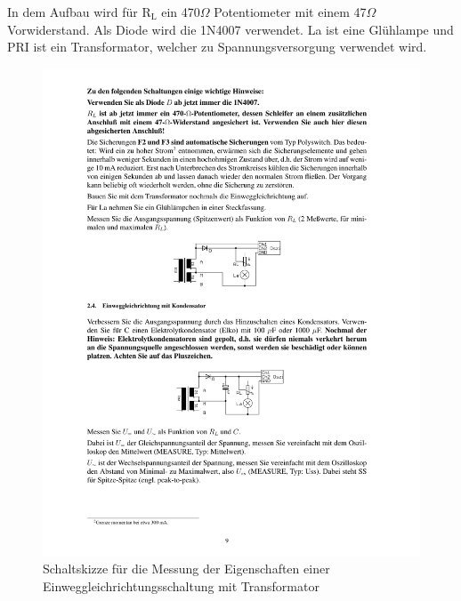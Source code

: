 \documentclass[12pt,a4paper]{article}
\begin{document}
In dem Aufbau wird für R$_\text{L}$ ein 470$\Omega$ Potentiometer mit einem 47$\Omega$ Vorwiderstand. Als Diode wird die 1N4007 verwendet. La ist eine Glühlampe und PRI ist ein Transformator, welcher zu Spannungsversorgung verwendet wird.

\begin{figure}[H] 
  \centering
    \includegraphics[trim = 10mm 150mm 10mm 95mm, clip, scale = 1]{ep2_14[Page9].pdf}
  	\caption[Schaltskizze für die Messung der Eigenschaften einer Einweggleichrichtungsschaltung mit Transformator]{Schaltskizze für die Messung der Eigenschaften einer Einweggleichrichtungsschaltung mit Transformator\footnotemark}
  \label{fig:2_4}
\end{figure}
\end{document}
